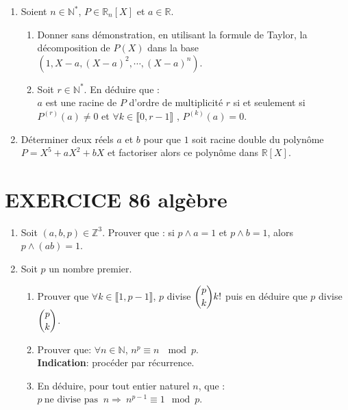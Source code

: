 \documentclass[10pt,oneside]{article}
\begin{document}
\begin{flushleft}
\begin{enumerate}
\item Soient $n \in{\mathbb{N}^{*}}$, $P\in{\mathbb{R}_{n}\left[ X\right] }$ et $a \in{\mathbb{R}}$.
\begin{enumerate}
\item Donner sans démonstration, en utilisant la formule de Taylor, la décomposition de $P(X)$ dans la base 
$\left( 1, X-a, \left( X-a\right) ^{2}, \cdots, (X-a)^{n}\right) $.
\item 
Soit $r\in{\mathbb{N}^{*}}$. En déduire que :\\$a$ est une racine de $P$ d'ordre de multiplicité $r$  si et seulement si $P^{(r)}(a)\neq 0$
et $\forall k \in{\llbracket 0,r-1 \rrbracket}$  , $P^{(k)}(a)=0$.
\end{enumerate}
\item Déterminer deux réels $a$ et $b$ pour que $1$ soit racine double du polynôme $P=X^{5}+aX^{2}+bX$ et factoriser alors ce polynôme dans $\mathbb{R}\left[ X\right] $.
\end{enumerate} 


\section*{EXERCICE 86 \: algèbre}


\begin{enumerate}
\item

Soit $(a,b,p)\in{\mathbb{Z}^{3}}$.
Prouver que : si $p \wedge a = 1 $ et $p\wedge b=1$, alors $p\wedge (ab)=1$.
\item
Soit $p$ un nombre premier.
\begin{enumerate}

\item 
 Prouver que $\forall k \in{\llbracket 1,p-1\rrbracket}$, $p$ divise $\dbinom{p}{k}k!$\:\:  puis en déduire que $p$ divise $\dbinom{p}{k}$.



\item 
Prouver que:  $\forall n \in{\mathbb{N}}$,\: $n^{p}\equiv n \:\mod p $.\\
\textbf{Indication}: procéder par récurrence.
\item
En déduire, pour tout entier naturel $n$, que : $  p \:\text{ne divise pas }\: n \Longrightarrow\: n^{p-1}\equiv 1 \mod p$.

\end{enumerate}

\end{enumerate}



\end{flushleft}
\end{document}
